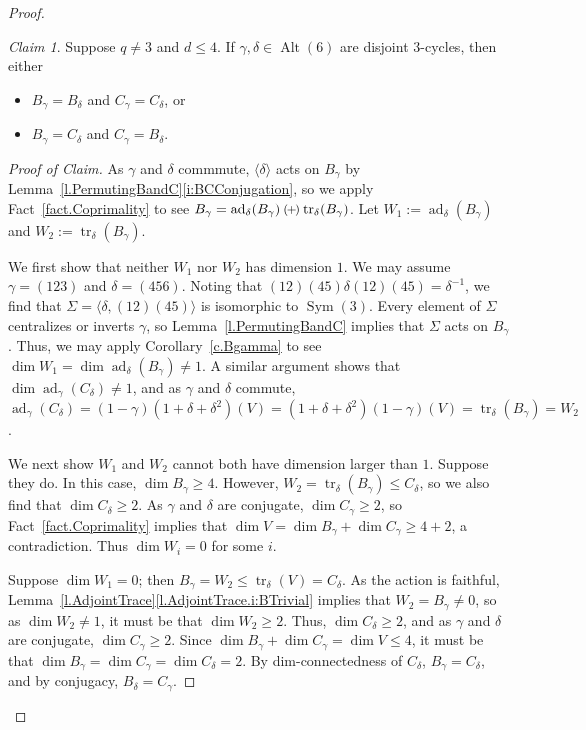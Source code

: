 \documentclass[a4paper, 11pt]{amsart}
\theoremstyle{plain}
\theoremstyle{definition}
\theoremstyle{remark}
\newtheorem{claim}{Claim}
\newenvironment{proofclaim}[1][Proof of Claim]{\begin{proof}[#1]\renewcommand{\qedsymbol}{$\lozenge$}}{\end{proof}}
\newcommand{\qoplus}{\mathbin{\scalerel*{\left(\mkern-2mu+\mkern-2mu\right)}{\bigcirc}}}
\DeclareMathOperator{\ad}{ad}
\DeclareMathOperator{\tr}{tr}
\DeclareMathOperator{\Sym}{Sym}
\DeclareMathOperator{\Alt}{Alt}
\begin{document}
\begin{proof}
\begin{claim}\label{l.Alt6:cl:dichotomy}
Suppose $q\ne 3$ and $d \le 4$. If $\gamma,\delta \in \Alt(6)$ are disjoint $3$-cycles, then either 
\begin{itemize}
    \item $B_\gamma = B_\delta$ and $C_\gamma = C_\delta$, or
    \item  $B_\gamma = C_\delta$ and $C_\gamma = B_\delta$.
\end{itemize} 
\end{claim}
\begin{proofclaim}
As $\gamma$ and $\delta$ commmute, $\langle\delta\rangle$ acts on $B_\gamma$ by Lemma~\ref{l.PermutingBandC}\eqref{i:BCConjugation}, so we apply Fact~\ref{fact.Coprimality}  to see $B_\gamma = \ad_\delta(B_\gamma) \qoplus \tr_\delta(B_\gamma)$. Let $W_1 := \ad_\delta(B_\gamma)$ and $W_2 := \tr_\delta(B_\gamma)$. 
 
We first show that neither $W_1$ nor $W_2$ has dimension $1$. We may assume $\gamma = (123)$ and $\delta = (456)$. Noting that $(12)(45)\delta(12)(45) = \delta^{-1}$, we find that  $\Sigma = \langle \delta, (12)(45)\rangle$ is isomorphic to $\Sym(3)$. Every element of $\Sigma$ centralizes or inverts $\gamma$, so Lemma~\ref{l.PermutingBandC} implies that $\Sigma$ acts on $B_{\gamma}$. Thus, we may apply Corollary~\ref{c.Bgamma} to see $\dim W_1 = \dim \ad_\delta(B_{\gamma}) \neq 1$. A similar argument shows that $\dim \ad_\gamma(C_{\delta}) \neq 1$, and as $\gamma$ and $\delta$ commute, $\ad_\gamma(C_{\delta}) = (1-\gamma)(1+\delta+\delta^2)(V) = (1+\delta+\delta^2)(1-\gamma)(V) = \tr_\delta(B_{\gamma}) = W_2$.
 
We next show $W_1$ and $W_2$ cannot both have dimension larger than $1$. Suppose they do. 
In this case, $\dim B_\gamma \ge 4$. However, $W_2=\tr_\delta(B_\gamma) \le  C_\delta$, so we also find that $\dim C_\delta \ge 2$.
As $\gamma$ and $\delta$ are conjugate, $\dim C_\gamma \ge 2$, so Fact~\ref{fact.Coprimality} implies that $\dim V =  \dim B_\gamma + \dim C_\gamma \ge 4+2$, a contradiction. 
Thus $\dim W_i = 0$ for some $i$. 

Suppose $\dim W_1 = 0$; then $B_\gamma = W_2 \le \tr_\delta(V) =  C_\delta$. As the action is faithful, Lemma~\ref{l.AdjointTrace}\eqref{l.AdjointTrace.i:BTrivial} implies that $W_2 = B_\gamma \neq 0$, so as $\dim W_2 \neq 1$, it must be that $\dim W_2 \ge 2$. Thus,  $\dim C_\delta\ge 2$, and as $\gamma$ and $\delta$ are conjugate, $\dim C_\gamma \ge 2$. Since
$\dim B_\gamma + \dim C_\gamma=\dim V \le 4$, it must be that $\dim B_\gamma = \dim C_\gamma = \dim C_\delta= 2$. By dim-connectedness of $C_\delta$, $B_\gamma = C_\delta$, and by conjugacy, $B_\delta = C_\gamma$.


\end{proofclaim}
\end{proof}
\end{document}

